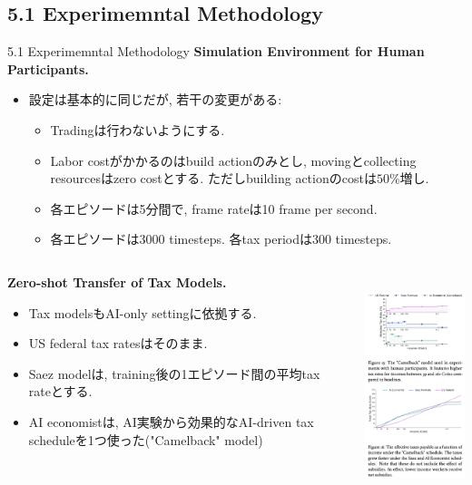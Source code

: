 \documentclass[unicode,aspectratio=169,11pt]{beamer}
\begin{document}
\subsection{5.1 Experimemntal Methodology}
\begin{frame}{5.1 Experimemntal Methodology}{}
    {\bf Simulation Environment for Human Participants.}
    \begin{itemize}
        \item 設定は基本的に同じだが, 若干の変更がある:
        \begin{itemize}
            \item Tradingは行わないようにする.
            \item Labor costがかかるのはbuild actionのみとし, movingとcollecting resourcesはzero costとする. ただしbuilding actionのcostは$50\%$増し.
            \item 各エピソードは5分間で, frame rateは10 frame per second.
            \item 各エピソードは3000 timesteps. 各tax periodは300 timesteps.
        \end{itemize}
    \end{itemize}
\end{frame}

\begin{frame}{}{}
\begin{columns}
    \begin{column}{0.6\textwidth}
        {\bf Zero-shot Transfer of Tax Models.}
        \begin{itemize}
            \item Tax modelsもAI-only settingに依拠する.
            \item US federal tax ratesはそのまま.
            \item Saez modelは, training後の1エピソード間の平均tax rateとする.
            \item AI economistは, AI実験から効果的なAI-driven tax scheduleを1つ使った("Camelback" model)
        \end{itemize}
    \end{column}
    \begin{column}{0.4\textwidth}
        　\\
        \includegraphics[width=4.7cm]{figure15.png}
    \end{column}
\end{columns}
\end{frame}
\end{document}
